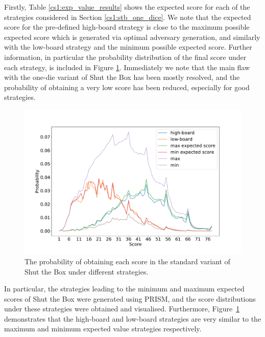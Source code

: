 Firstly, Table \ref{cs1:exp_value_results} shows the expected score for each of the strategies considered in Section \ref{cs1:stb_one_dice}. We note that the expected score for the pre-defined high-board strategy is close to the maximum possible expected score which is generated via optimal adversary generation, and similarly with the low-board strategy and the minimum possible expected score. Further information, in particular the probability distribution of the final score under each strategy, is included in Figure \ref{cs1:stb12_2d6_prob_score}. Immediately we note that the main flaw with the one-die variant of Shut the Box has been mostly resolved, and the probability of obtaining a very low score has been reduced, especially for good strategies.

\begin{figure}
    \centering
    \includegraphics[width=\textwidth]{images/ShutTheBox/stb12_2d6_prob_score.pdf}
    \caption{The probability of obtaining each score in the standard variant of Shut the Box under different strategies.}
\label{cs1:stb12_2d6_prob_score}
\end{figure}


In particular, the strategies leading to the minimum and maximum expected scores of Shut the Box were generated using PRISM, and the score distributions under these strategies were obtained and visualised. Furthermore, Figure~\ref{cs1:stb12_2d6_prob_score} demonstrates that the high-board and low-board strategies are very similar to the maximum and minimum expected value strategies respectively.

